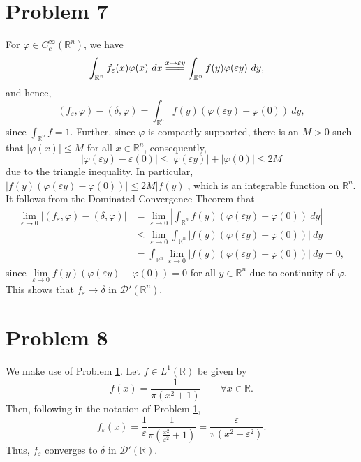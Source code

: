 \documentclass[10pt]{amsart}
\theoremstyle{thmstyle}
\theoremstyle{defstyle}
\newcommand{\R}{\mathbb{R}}
\renewcommand{\le}{\leqslant}
\begin{document}
\section{Problem 7}\label{problem-7}

For $\varphi\in C_c^\infty(\R^n)$, we have 
\begin{align*}
	\int_{\R^n} f_\varepsilon(x)\varphi(x)~dx &\stackrel{x\mapsto \varepsilon y}{=\joinrel=\joinrel=} \int_{\R^n}f(y)\varphi(\varepsilon y)~dy,
\end{align*}
and hence, 
\begin{equation*}
	\left(f_\varepsilon,\varphi\right) - (\delta, \varphi) = \int_{\R^n} f(y)\left(\varphi(\varepsilon y) - \varphi(0)\right)~dy,
\end{equation*}
since $\int_{\R^n} f = 1$. Further, since $\varphi$ is compactly supported, there is an $M > 0$ such that $|\varphi(x)|\le M$ for all $x\in\R^n$, consequently, 
\begin{equation*}
	|\varphi(\varepsilon y) - \varepsilon(0)|\le |\varphi(\varepsilon y)| + |\varphi(0)|\le 2M
\end{equation*}
due to the triangle inequality. In particular, $|f(y)(\varphi(\varepsilon y) - \varphi(0))|\le 2M|f(y)|$, which is an integrable function on $\R^n$. It follows from the Dominated Convergence Theorem that
\begin{align*}
	\lim_{\varepsilon\to 0}|(f_\varepsilon, \varphi) - (\delta, \varphi)| &=\lim_{\varepsilon\to 0}\left|\int_{\R^n} f(y)(\varphi(\varepsilon y) - \varphi(0))~dy\right|\\
	&\le\lim_{\varepsilon\to 0}\int_{\R^n} |f(y)(\varphi(\varepsilon y) - \varphi(0))|~dy\\
	&= \int_{\R^n} \lim_{\varepsilon\to 0}|f(y)(\varphi(\varepsilon y) - \varphi(0))|~dy = 0,
\end{align*}
since $\lim\limits_{\varepsilon\to 0} f(y)(\varphi(\varepsilon y) - \varphi(0)) = 0$ for all $y\in\R^n$ due to continuity of $\varphi$. This shows that $f_\varepsilon\to\delta$ in $\mathscr D'(\R^n)$.

\section{Problem 8}\label{problem-8}

We make use of Problem \ref{problem-7}. Let $f\in L^1(\R)$ be given by 
\begin{equation*}
	f(x) = \frac{1}{\pi(x^2 + 1)}\qquad\forall x\in\R.
\end{equation*}
Then, following in the notation of Problem \ref{problem-7},
\begin{equation*}
	f_\varepsilon(x) = \frac{1}{\varepsilon}\frac{1}{\pi\left(\frac{x^2}{\varepsilon^2} + 1\right)} = \frac{\varepsilon}{\pi(x^2 + \varepsilon^2)}.
\end{equation*}
Thus, $f_\varepsilon$ converges to $\delta$ in $\mathscr D'(\R)$.
\end{document}
